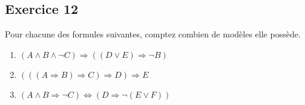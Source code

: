 %
%
%
%
%
%
%

%

%


\subsection*{Exercice 12}
Pour chacune des formules suivantes, comptez combien de modèles elle possède.
\begin{enumerate}
 \item $(A \land B \land \neg C) \Rightarrow ((D \lor E) \Rightarrow \neg B)$
 \item $(((A \Rightarrow B) \Rightarrow C) \Rightarrow D) \Rightarrow E$
 \item $(A \land B \Rightarrow \neg C) \Leftrightarrow (D \Rightarrow \neg (E \lor F))$
\end{enumerate}


